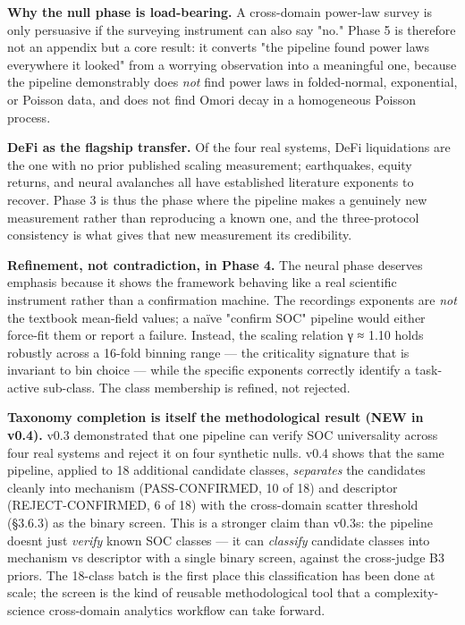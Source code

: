 \documentclass[
  11pt]{article}
\begin{document}
\textbf{Why the null phase is load-bearing.} A cross-domain power-law
survey is only persuasive if the surveying instrument can also say "no."
Phase 5 is therefore not an appendix but a core result: it converts "the
pipeline found power laws everywhere it looked" from a worrying
observation into a meaningful one, because the pipeline demonstrably
does \emph{not} find power laws in folded-normal, exponential, or
Poisson data, and does not find Omori decay in a homogeneous Poisson
process.

\textbf{DeFi as the flagship transfer.} Of the four real systems, DeFi
liquidations are the one with no prior published scaling measurement;
earthquakes, equity returns, and neural avalanches all have established
literature exponents to recover. Phase 3 is thus the phase where the
pipeline makes a genuinely new measurement rather than reproducing a
known one, and the three-protocol consistency is what gives that new
measurement its credibility.

\textbf{Refinement, not contradiction, in Phase 4.} The neural phase
deserves emphasis because it shows the framework behaving like a real
scientific instrument rather than a confirmation machine. The
recording\textquotesingle s exponents are \emph{not} the textbook
mean-field values; a naïve "confirm SOC" pipeline would either force-fit
them or report a failure. Instead, the scaling relation γ ≈ 1.10 holds
robustly across a 16-fold binning range --- the criticality signature
that is invariant to bin choice --- while the specific exponents
correctly identify a task-active sub-class. The class membership is
refined, not rejected.

\textbf{Taxonomy completion is itself the methodological result (NEW in
v0.4).} v0.3 demonstrated that one pipeline can verify SOC universality
across four real systems and reject it on four synthetic nulls. v0.4
shows that the same pipeline, applied to 18 additional candidate
classes, \emph{separates} the candidates cleanly into mechanism
(PASS-CONFIRMED, 10 of 18) and descriptor (REJECT-CONFIRMED, 6 of 18)
with the cross-domain scatter threshold (§3.6.3) as the binary screen.
This is a stronger claim than v0.3\textquotesingle s: the pipeline
doesn\textquotesingle t just \emph{verify} known SOC classes --- it can
\emph{classify} candidate classes into mechanism vs descriptor with a
single binary screen, against the cross-judge B3 priors. The 18-class
batch is the first place this classification has been done at scale; the
screen is the kind of reusable methodological tool that a
complexity-science cross-domain analytics workflow can take forward.
\end{document}
